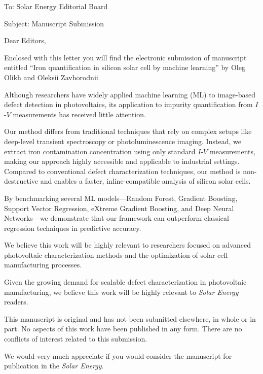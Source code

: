 \documentclass[preprint]{elsarticle}
\begin{document}
To:
Solar Energy Editorial Board


Subject:
Manuscript Submission

\vspace{5mm}
Dear Editors,

\vspace{3mm}
Enclosed with this letter you will find the electronic submission of manuscript entitled
``Iron quantification in silicon solar cell by machine learning'' by Oleg Olikh and Oleksii Zavhorodnii

Although researchers have widely applied machine learning (ML) to image-based defect detection in photovoltaics, its application to impurity quantification from $I$-$V$ measurements has received little attention.

 
Our method differs from traditional techniques that rely on complex setups like deep-level transient spectroscopy or photoluminescence imaging. Instead, we extract iron contamination concentration using only standard $I$-$V$ measurements, making our approach highly accessible and applicable to industrial settings. Compared to conventional defect characterization techniques, our method is non-destructive and enables a faster, inline-compatible analysis of silicon solar cells. 


By benchmarking several ML models—Random Forest, Gradient Boosting, Support Vector Regression, eXtreme Gradient Boosting, and Deep Neural Networks—we demonstrate that our framework can outperform classical regression techniques in predictive accuracy. 


We believe this work will be highly relevant to researchers focused on advanced photovoltaic characterization methods and the optimization of solar cell manufacturing processes. 


Given the growing demand for scalable defect characterization in photovoltaic manufacturing, we believe this work will be highly relevant to \emph{Solar Energy} readers.


This manuscript is original and has not been submitted elsewhere, in whole or in part. 
No aspects of this work have been published in any form. 
There are no conflicts of interest related to this submission.


We would  very much appreciate if you would consider the manuscript for publication in the \emph{Solar Energy}.
\end{document}
